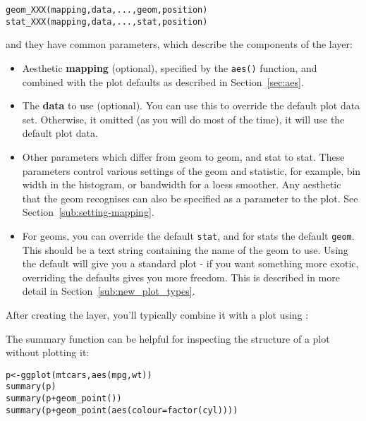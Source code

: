 \begin{alltt}
geom_XXX(mapping, data, ..., geom, position)
stat_XXX(mapping, data, ..., stat, position)
\end{alltt}

\noindent and they have common parameters, which describe the components of the layer:

\begin{itemize}
	\item Aesthetic {\bf mapping} (optional), specified by the {\tt aes()} function, and combined with the plot defaults as described in Section~\ref{sec:aes}.

	\item The {\bf data} to use (optional).  You can use this to override the default plot data set.  Otherwise, it omitted  (as you will do most of the time), it will use the default plot data.
	
	\item Other parameters which differ from geom to geom, and stat to stat.  These parameters control various settings of the geom and statistic, for example, bin width in the histogram, or bandwidth for a loess smoother.  Any aesthetic that the geom recognises can also be specified as a parameter to the plot.  See Section~\ref{sub:setting-mapping}.
	
	\item For geoms, you can override the default {\tt stat}, and for stats the default {\tt geom}.  This should be a text string containing the name of the geom to use.  Using the default will give you a standard plot - if you want something more exotic, overriding the defaults gives you more freedom.  This is described in more detail in Section~\ref{sub:new_plot_types}.
  
\end{itemize}

After creating the layer, you'll typically combine it with a plot using  \code{+}:

% 


\noindent The summary function can be helpful for inspecting the structure of a plot without plotting it:

%

\begin{alltt}
p <- ggplot(mtcars, aes(mpg, wt))
summary(p)
summary(p + geom_point())
summary(p + geom_point(aes(colour = factor(cyl))))
\end{alltt}

